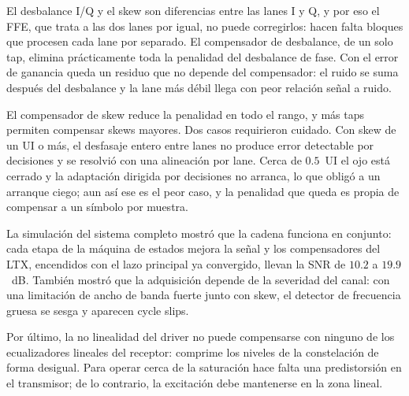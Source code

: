 El desbalance I/Q y el skew son diferencias entre las lanes I y Q, y por
eso el FFE, que trata a las dos lanes por igual, no puede corregirlos:
hacen falta bloques que procesen cada lane por separado. El compensador de
desbalance, de un solo tap, elimina prácticamente toda la penalidad del
desbalance de fase. Con el error de ganancia queda un residuo que no
depende del compensador: el ruido se suma después del desbalance y la lane
más débil llega con peor relación señal a ruido.

El compensador de skew reduce la penalidad en todo el rango, y más taps
permiten compensar skews mayores. Dos casos requirieron cuidado. Con
skew de un UI o más, el desfasaje entero entre lanes no produce error
detectable por decisiones y se resolvió con una alineación por lane. Cerca
de $0.5$~UI el ojo está cerrado y la adaptación dirigida por decisiones no
arranca, lo que obligó a un arranque ciego; aun así ese es el peor caso,
y la penalidad que queda es propia de compensar a un símbolo por muestra.

La simulación del sistema completo mostró que la cadena funciona en
conjunto: cada etapa de la máquina de estados mejora la señal y los
compensadores del LTX, encendidos con el lazo principal ya convergido,
llevan la SNR de $10.2$ a $19.9$~dB. También mostró que la adquisición
depende de la severidad del canal: con una limitación de ancho de banda
fuerte junto con skew, el detector de frecuencia gruesa se sesga y
aparecen cycle slips.

Por último, la no linealidad del driver no puede compensarse con ninguno
de los ecualizadores lineales del receptor: comprime los niveles de la
constelación de forma desigual. Para operar cerca de la saturación hace
falta una predistorsión en el transmisor; de lo contrario, la excitación
debe mantenerse en la zona lineal.
